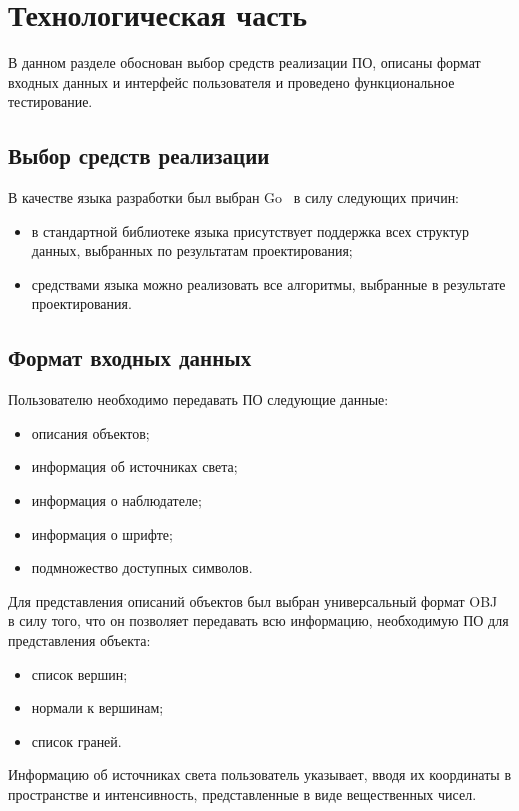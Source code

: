 \chapter{Технологическая часть}

В данном разделе обоснован выбор средств реализации ПО, описаны формат входных данных и интерфейс пользователя и проведено функциональное тестирование.

\section{Выбор средств реализации}

В качестве языка разработки был выбран Go~\cite{go} в силу следующих причин:
\begin{itemize}
    \item в стандартной библиотеке языка присутствует поддержка всех структур данных, выбранных по результатам проектирования;
    \item средствами языка можно реализовать все алгоритмы, выбранные в результате проектирования.
\end{itemize}

\section{Формат входных данных}

Пользователю необходимо передавать ПО следующие данные:
\begin{itemize}
    \item описания объектов;
    \item информация об источниках света;
    \item информация о наблюдателе;
    \item информация о шрифте;
    \item подмножество доступных символов.
\end{itemize}

Для представления описаний объектов был выбран универсальный формат OBJ~\cite{obj} в силу того, что он позволяет передавать всю информацию, необходимую ПО для представления объекта:
\begin{itemize}
    \item список вершин;
    \item нормали к вершинам;
    \item список граней.
\end{itemize}

Информацию об источниках света пользователь указывает, вводя их координаты в пространстве и интенсивность, представленные в виде вещественных чисел.

